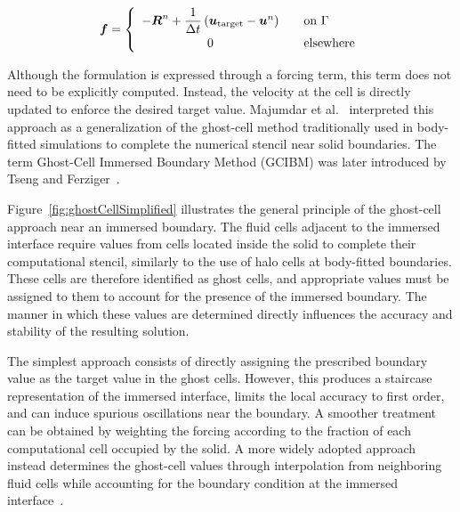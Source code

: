 
\begin{equation}
    \boldsymbol{f}
    =
    \left\{
    \begin{array}{c l}
        -\boldsymbol{R}^{n}
        + \dfrac{1}{\Delta t}
        \left(
        \boldsymbol{u}_{\mathrm{target}}
        - \boldsymbol{u}^{n}
        \right)
        & \quad \text{on } \Gamma \\[6pt]
        0
        & \quad \text{elsewhere}
    \end{array}
    \right.
    \label{eq:discreteForcing}
\end{equation}

Although the formulation is expressed through a forcing term, this term does not need to be explicitly computed. Instead, the velocity at the cell is directly updated to enforce the desired target value. Majumdar et al.~\cite{majumdar2001rans} interpreted this approach as a generalization of the ghost-cell method traditionally used in body-fitted simulations to complete the numerical stencil near solid boundaries. The term Ghost-Cell Immersed Boundary Method (GCIBM) was later introduced by Tseng and Ferziger~\cite{tseng2003ghost}.

Figure~\ref{fig:ghostCellSimplified} illustrates the general principle of the ghost-cell approach near an immersed boundary. The fluid cells adjacent to the immersed interface require values from cells located inside the solid to complete their computational stencil, similarly to the use of halo cells at body-fitted boundaries. These cells are therefore identified as ghost cells, and appropriate values must be assigned to them to account for the presence of the immersed boundary. The manner in which these values are determined directly influences the accuracy and stability of the resulting solution.

The simplest approach consists of directly assigning the prescribed boundary value as the target value in the ghost cells. However, this produces a staircase representation of the immersed interface, limits the local accuracy to first order, and can induce spurious oscillations near the boundary. A smoother treatment can be obtained by weighting the forcing according to the fraction of each computational cell occupied by the solid. A more widely adopted approach instead determines the ghost-cell values through interpolation from neighboring fluid cells while accounting for the boundary condition at the immersed interface~\cite{fadlun2000combined,tseng2003ghost}.

